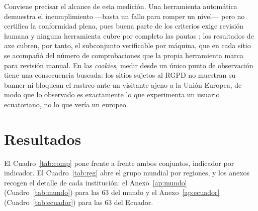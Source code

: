 \documentclass[pdflatex,sn-basic,Numbered]{sn-jnl}
\theoremstyle{thmstyleone}
\theoremstyle{thmstyletwo}
\theoremstyle{thmstylethree}
\begin{document}
Conviene precisar el alcance de esta medición. Una herramienta automática demuestra el incumplimiento ---basta un fallo para romper un nivel--- pero no certifica la conformidad plena, pues buena parte de los criterios exige revisión humana y ninguna herramienta cubre por completo las pautas \citep{fischer2025coverage}; los resultados de axe cubren, por tanto, el subconjunto verificable por máquina, que en cada sitio se acompañó del número de comprobaciones que la propia herramienta marca para revisión manual. En las \emph{cookies}, medir desde un único punto de observación tiene una consecuencia buscada: los sitios sujetos al RGPD no muestran su banner ni bloquean el rastreo ante un visitante ajeno a la Unión Europea, de modo que lo observado es exactamente lo que experimenta un usuario ecuatoriano, no lo que vería un europeo.

\section{Resultados}\label{sec:resultados}
El Cuadro~\ref{tab:comp} pone frente a frente ambos conjuntos, indicador por indicador. El Cuadro~\ref{tab:reg} abre el grupo mundial por regiones, y los anexos recogen el detalle de cada institución: el Anexo~\ref{ap:mundo} (Cuadro~\ref{tab:mundo}) para las 63 del mundo y el Anexo~\ref{ap:ecuador} (Cuadro~\ref{tab:ecuador}) para las 63 del Ecuador.
\end{document}
